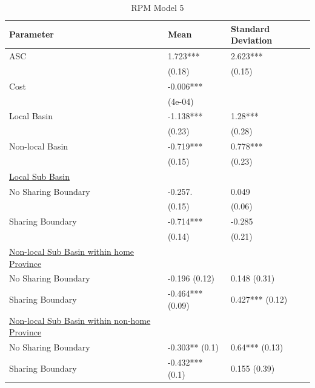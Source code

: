 \begin{table}[ht]
\caption{RPM Model 5 } 
\centering
\begin{tabular}{p{8cm} p{1.5cm} p{1.5cm}}
  \hline
Parameter & Mean & Standard Deviation \\ 
  \hline
ASC & 1.723*** & 2.623*** \\ 
   & (0.18) & (0.15) \\ 
Cost & -0.006*** &  \\ 
   & (4e-04) &  \\ 
Local Basin & -1.138*** & 1.28*** \\ 
   & (0.23) & (0.28) \\ 
Non-local Basin & -0.719*** & 0.778*** \\ 
   & (0.15) & (0.23) \\ 

\underline{Local Sub Basin}  &  & \\ 
No Sharing Boundary & -0.257. & 0.049 \\ 
   & (0.15) & (0.06) \\ 
Sharing Boundary & -0.714*** & -0.285 \\ 
   & (0.14) & (0.21) \\ 

\underline{Non-local Sub Basin within home Province}  &  & \\ 

No Sharing Boundary & -0.196 (0.12) & 0.148 (0.31) \\ 
Sharing Boundary & -0.464*** (0.09) & 0.427*** (0.12) \\

\underline{Non-local Sub Basin within non-home Province}  &  & \\ 

No Sharing Boundary & -0.303** (0.1) & 0.64*** (0.13)\\ 
Sharing Boundary & -0.432*** (0.1) & 0.155 (0.39) \\ 
   \hline
\end{tabular}
\end{table}

